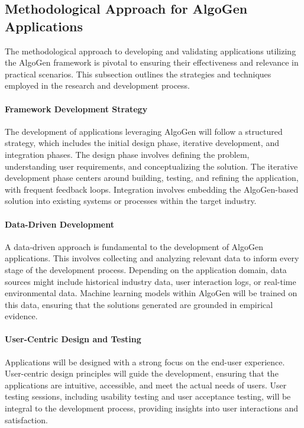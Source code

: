 \documentclass{article}
\begin{document}
\subsection{Methodological Approach for AlgoGen Applications}

The methodological approach to developing and validating applications utilizing the AlgoGen framework is pivotal to ensuring their effectiveness and relevance in practical scenarios. This subsection outlines the strategies and techniques employed in the research and development process.

\paragraph{Framework Development Strategy}
The development of applications leveraging AlgoGen will follow a structured strategy, which includes the initial design phase, iterative development, and integration phases. The design phase involves defining the problem, understanding user requirements, and conceptualizing the solution. The iterative development phase centers around building, testing, and refining the application, with frequent feedback loops. Integration involves embedding the AlgoGen-based solution into existing systems or processes within the target industry.

\paragraph{Data-Driven Development}
A data-driven approach is fundamental to the development of AlgoGen applications. This involves collecting and analyzing relevant data to inform every stage of the development process. Depending on the application domain, data sources might include historical industry data, user interaction logs, or real-time environmental data. Machine learning models within AlgoGen will be trained on this data, ensuring that the solutions generated are grounded in empirical evidence.

\paragraph{User-Centric Design and Testing}
Applications will be designed with a strong focus on the end-user experience. User-centric design principles will guide the development, ensuring that the applications are intuitive, accessible, and meet the actual needs of users. User testing sessions, including usability testing and user acceptance testing, will be integral to the development process, providing insights into user interactions and satisfaction.
\end{document}
